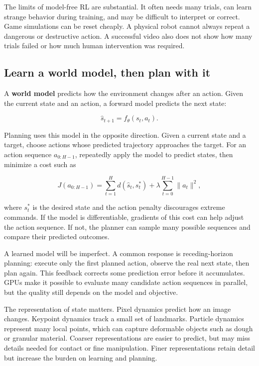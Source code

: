 The limits of model-free RL are substantial. It often needs many trials, can learn strange behavior during training, and may be difficult to interpret or correct. Game simulations can be reset cheaply. A physical robot cannot always repeat a dangerous or destructive action. A successful video also does not show how many trials failed or how much human intervention was required.

\subsection{Learn a world model, then plan with it}\label{04-visual-computing-ii-ch034-learn-a-world-model-then-plan-with-it}

A \textbf{world model} predicts how the environment changes after an action. Given the current state and an action, a forward model predicts the next state:

\[
\hat{s}_{t+1}=f_\theta(s_t,a_t).
\]

Planning uses this model in the opposite direction. Given a current state and a target, choose actions whose predicted trajectory approaches the target. For an action sequence \(a_{0:H-1}\), repeatedly apply the model to predict states, then minimize a cost such as

\[
J(a_{0:H-1})=\sum_{t=1}^{H} d(\hat{s}_t,s^*_t)+\lambda\sum_{t=0}^{H-1}\|a_t\|^2,
\]

where \(s^*_t\) is the desired state and the action penalty discourages extreme commands. If the model is differentiable, gradients of this cost can help adjust the action sequence. If not, the planner can sample many possible sequences and compare their predicted outcomes.

A learned model will be imperfect. A common response is receding-horizon planning: execute only the first planned action, observe the real next state, then plan again. This feedback corrects some prediction error before it accumulates. GPUs make it possible to evaluate many candidate action sequences in parallel, but the quality still depends on the model and objective.

The representation of state matters. Pixel dynamics predict how an image changes. Keypoint dynamics track a small set of landmarks. Particle dynamics represent many local points, which can capture deformable objects such as dough or granular material. Coarser representations are easier to predict, but may miss details needed for contact or fine manipulation. Finer representations retain detail but increase the burden on learning and planning.

